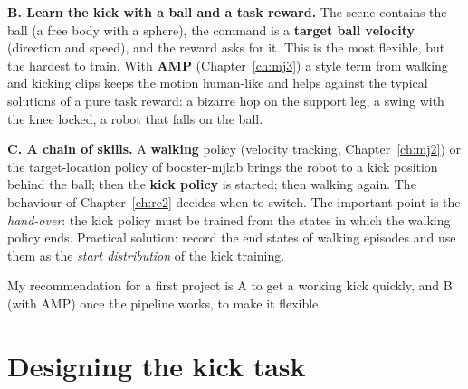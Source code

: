 \textbf{B. Learn the kick with a ball and a task reward.} The scene contains the ball (a free body with a sphere), the command is a \textbf{target ball velocity} (direction and speed), and the reward asks for it. This is the most flexible, but the hardest to train. With \textbf{AMP} (Chapter~\ref{ch:mj3}) a style term from walking and kicking clips keeps the motion human-like and helps against the typical solutions of a pure task reward: a bizarre hop on the support leg, a swing with the knee locked, a robot that falls on the ball.

\textbf{C. A chain of skills.} A \textbf{walking} policy (velocity tracking, Chapter~\ref{ch:mj2}) or the target-location policy of booster-mjlab brings the robot to a kick position behind the ball; then the \textbf{kick policy} is started; then walking again. The behaviour of Chapter~\ref{ch:rc2} decides when to switch. The important point is the \emph{hand-over}: the kick policy must be trained from the states in which the walking policy ends. Practical solution: record the end states of walking episodes and use them as the \emph{start distribution} of the kick training.

My recommendation for a first project is A to get a working kick quickly, and B (with AMP) once the pipeline works, to make it flexible.

\section*{Designing the kick task}
\begin{center}
\end{center}

